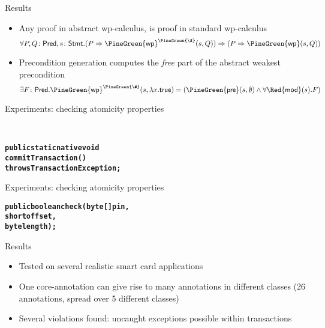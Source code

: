 \documentclass[final,nocolorBG,a4,marieke,nototal,pdf, accumulate,slideColor]{prosper}
\begin{document}
\begin{slide}{Results}
\begin{itemize}
\item Any proof in abstract wp-calculus, is proof in standard
wp-calculus
\[
\forall P, Q\colon\mathsf{Pred}, s\colon\mathsf{Stmt}. 
(P \Rightarrow \mathsf{\PineGreen{wp}}^{\PineGreen{\#}}(s, Q)) \Rightarrow
               (P \Rightarrow \mathsf{\PineGreen{wp}}(s, Q))
\]
\item Precondition generation computes the \emph{free} part of the
abstract weakest precondition
\[
\exists F\colon\mathsf{Pred}.  
             \mathsf{\PineGreen{wp}}^{\PineGreen{\#}}(s, \lambda x. \mathsf{true}) = 
             (\mathsf{\PineGreen{pre}}(s, \emptyset) \wedge \forall
              \mathsf{\Red{mod}}(s). F) 
\]
\end{itemize}
\end{slide}

\begin{slide}{Experiments: checking atomicity properties}

\smallskip\\

\begin{alltt}
\textbf{
public static native void 
   commitTransaction() 
         throws TransactionException;}
\end{alltt}
\end{slide}

\begin{slide}{Experiments: checking atomicity properties}
\smallskip\\

\begin{alltt}
\textbf{
public boolean check(byte[] pin, 
                     short offset, 
                     byte length);}
\end{alltt}
\end{slide}

\begin{slide}{Results}
\begin{itemize}
\item Tested on several realistic smart card applications
\item One core-annotation can give rise to many annotations in
different classes (26 annotations, spread over 5 different classes)
\item Several violations found: uncaught exceptions possible within
transactions 
\end{itemize}
\end{slide}
\end{document}
